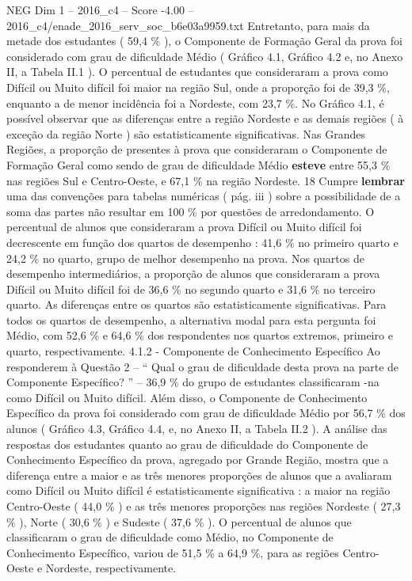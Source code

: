 \begin{textsample}{NEG Dim 1 – 2016\_c4 – Score -4.00 – 2016\_c4/enade\_2016\_serv\_soc\_b6e03a9959.txt}
Entretanto, para mais da metade dos estudantes ( 59,4 \% ), o Componente de Formação Geral da prova foi considerado com grau de dificuldade Médio ( Gráfico 4.1, Gráfico 4.2 e, no Anexo II, a Tabela II.1 ).
O percentual de estudantes que consideraram a prova como Difícil ou Muito difícil foi maior na região Sul, onde a proporção foi de 39,3 \%, enquanto a de menor incidência foi a Nordeste, com 23,7 \%.
No Gráfico 4.1, é possível observar que as diferenças entre a região Nordeste e as demais regiões ( à exceção da região Norte ) são estatisticamente significativas.
Nas Grandes Regiões, a proporção de presentes à prova que consideraram o Componente de Formação Geral como sendo de grau de dificuldade Médio \textbf{esteve} entre 55,3 \% nas regiões Sul e Centro-Oeste, e 67,1 \% na região Nordeste. 18 Cumpre \textbf{lembrar} uma das convenções para tabelas numéricas ( pág. iii ) sobre a possibilidade de a soma das partes não resultar em 100 \% por questões de arredondamento.
O percentual de alunos que consideraram a prova Difícil ou Muito difícil foi decrescente em função dos quartos de desempenho : 41,6 \% no primeiro quarto e 24,2 \% no quarto, grupo de melhor desempenho na prova.
Nos quartos de desempenho intermediários, a proporção de alunos que consideraram a prova Difícil ou Muito difícil foi de 36,6 \% no segundo quarto e 31,6 \% no terceiro quarto.
As diferenças entre os quartos são estatisticamente significativas.
Para todos os quartos de desempenho, a alternativa modal para esta pergunta foi Médio, com 52,6 \% e 64,6 \% dos respondentes nos quartos extremos, primeiro e quarto, respectivamente. 4.1.2 - Componente de Conhecimento Específico Ao responderem à Questão 2 – “ Qual o grau de dificuldade desta prova na parte de Componente Específico? ” – 36,9 \% do grupo de estudantes classificaram -na como Difícil ou Muito difícil.
Além disso, o Componente de Conhecimento Específico da prova foi considerado com grau de dificuldade Médio por 56,7 \% dos alunos ( Gráfico 4.3, Gráfico 4.4, e, no Anexo II, a Tabela II.2 ).
A análise das respostas dos estudantes quanto ao grau de dificuldade do Componente de Conhecimento Específico da prova, agregado por Grande Região, mostra que a diferença entre a maior e as três menores proporções de alunos que a avaliaram como Difícil ou Muito difícil é estatisticamente significativa : a maior na região Centro-Oeste ( 44,0 \% ) e as três menores proporções nas regiões Nordeste ( 27,3 \% ), Norte ( 30,6 \% ) e Sudeste ( 37,6 \% ).
O percentual de alunos que classificaram o grau de dificuldade como Médio, no Componente de Conhecimento Específico, variou de 51,5 \% a 64,9 \%, para as regiões Centro-Oeste e Nordeste, respectivamente.

\end{textsample}
